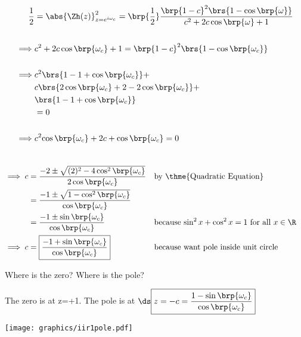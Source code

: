 {\begin{align*}
  \frac{1}{2}
    &= \abs{\Zh(z)}^2_{z=e^{i\omega_c}}
     = \brp{\frac{1}{2}}
       \frac{\brp{1-c}^2\brs{1 -  \cos\brp{\omega}}}
            {c^2 + 2 c\cos\brp{\omega} + 1}
  \\\\\implies &c^2 + 2 c\cos\brp{\omega_c} + 1 
             = \brp{1-c}^2\brs{1 -  \cos\brp{\omega_c}}
  \\\\\implies & c^2\brs{1-1+\cos\brp{\omega_c}} + 
             \\& c  \brs{2\cos\brp{\omega_c}+2-2\cos\brp{\omega_c}} +
             \\&    \brs{1-1+\cos\brp{\omega_c}}
             \\&= 0
  \\\\\implies & c^2{\cos\brp{\omega_c}} 
             + 2c 
             +    \cos\brp{\omega_c}
             = 0
\end{align*}}



{\begin{align*}
  \\\implies c &= \frac{-2 \pm \sqrt{(2)^2 -4\cos^2\brp{\omega_c}}}
                       {2\cos\brp{\omega_c}}
               && \text{by \thme{Quadratic Equation}}
             \\&= \frac{-1 \pm \sqrt{1 -\cos^2\brp{\omega_c}}}
                       {\cos\brp{\omega_c}}
             \\&= \frac{-1 \pm \sin\brp{\omega_c}}
                       {\cos\brp{\omega_c}}
               && \text{because $\sin^2x + \cos^2x = 1$ for all $x\in\R$}
  \\\implies c &=
      \boxed{\frac{-1 + \sin\brp{\omega_c}}
                    {\cos\brp{\omega_c}}}
               && \text{because want pole inside unit circle}
\end{align*}}


Where is the zero? Where is the pole?

The zero is at z=+1. \qquad The pole is at 
$\ds\boxed{z=-c = \frac{1 - \sin\brp{\omega_c}}
                    {\cos\brp{\omega_c}}}$

\texttt{[image: graphics/iir1pole.pdf]}



